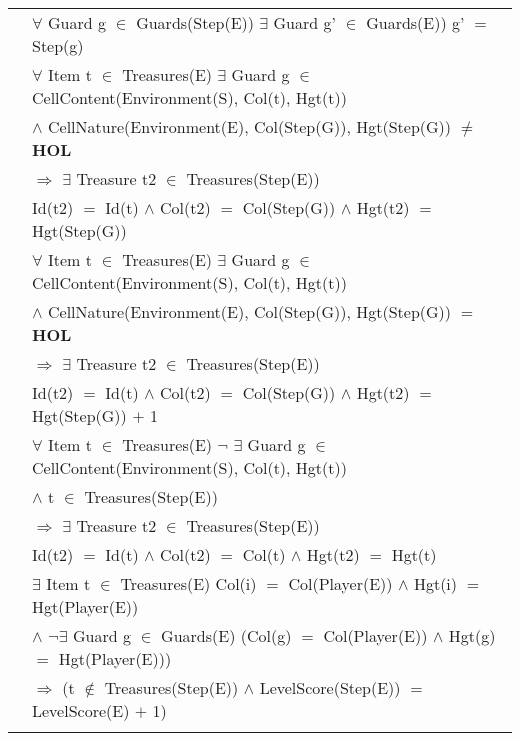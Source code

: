 \documentclass[8pt]{article}
\begin{document}
{\begin{longtable}{rl}
  & $\forall$ \textrm{Guard} g $\in$ \textrm{Guards(Step(E))} $\exists$ \textrm{Guard} g' $\in$ \textrm{Guards(E))} g' $=$ \textrm{Step(g)}\\
  & $\forall$ \textrm{Item} t $\in$ \textrm{Treasures(E)} $\exists$ \textrm{Guard} g $\in$ \textrm{CellContent(Environment(S), Col(t), Hgt(t))}\\
  & \quad\quad $\land$ \textrm{CellNature(Environment(E), Col(Step(G)), Hgt(Step(G))} $\ne$ \textbf{HOL}\\
  & \quad\quad $\Rightarrow$ $\exists$ \textrm{Treasure} t2 $\in$ \textrm{Treasures(Step(E))}\\
  & \quad\quad\quad\quad \textrm{Id(t2)} $=$ \textrm{Id(t)} $\land$ \textrm{Col(t2)} $=$ \textrm{Col(Step(G))} $\land$ \textrm{Hgt(t2)} $=$ \textrm{Hgt(Step(G))}\\
  & $\forall$ \textrm{Item} t $\in$ \textrm{Treasures(E)} $\exists$ \textrm{Guard} g $\in$ \textrm{CellContent(Environment(S), Col(t), Hgt(t))}\\
  & \quad\quad $\land$ \textrm{CellNature(Environment(E), Col(Step(G)), Hgt(Step(G))} $=$ \textbf{HOL}\\
  & \quad\quad $\Rightarrow$ $\exists$ \textrm{Treasure} t2 $\in$ \textrm{Treasures(Step(E))}\\
  & \quad\quad\quad\quad \textrm{Id(t2)} $=$ \textrm{Id(t)} $\land$ \textrm{Col(t2)} $=$ \textrm{Col(Step(G))} $\land$ \textrm{Hgt(t2)} $=$ \textrm{Hgt(Step(G))} $+$ 1\\
& $\forall$ \textrm{Item} t $\in$ \textrm{Treasures(E)} $\neg$ $\exists$ \textrm{Guard} g $\in$ \textrm{CellContent(Environment(S), Col(t), Hgt(t))}\\
  & \quad\quad $\land$ t $\in$ \textrm{Treasures(Step(E))} \\
  & \quad\quad $\Rightarrow$ $\exists$ \textrm{Treasure} t2 $\in$ \textrm{Treasures(Step(E))}\\
  & \quad\quad\quad\quad \textrm{Id(t2)} $=$ \textrm{Id(t)} $\land$ \textrm{Col(t2)} $=$ \textrm{Col(t)} $\land$ \textrm{Hgt(t2)} $=$ \textrm{Hgt(t)}\\
  & $\exists$ \textrm{Item} t $\in$ \textrm{Treasures(E)} \textrm{Col(i)} $=$ \textrm{Col(Player(E))} $\land$ \textrm{Hgt(i)} $=$ \textrm{Hgt(Player(E))}\\
  & \quad\quad $\land$ $\neg$$\exists$ \textrm{Guard} g $\in$ \textrm{Guards(E)} (\textrm{Col(g)} $=$ \textrm{Col(Player(E))} $\land$ \textrm{Hgt(g)} $=$ \textrm{Hgt(Player(E))})\\
  & \quad\quad $\Rightarrow$ (t $\notin$ Treasures(Step(E)) $\land$ \textrm{LevelScore(Step(E))} $=$ \textrm{LevelScore(E)} $+$ 1)\\
$$
\end{longtable}}
\end{document}
